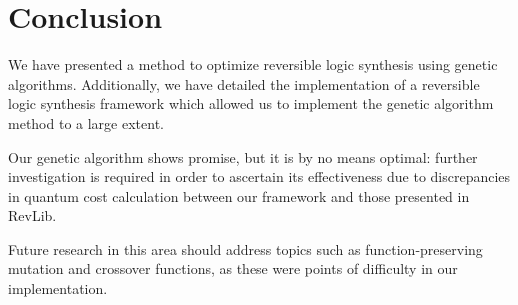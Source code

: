 \section{Conclusion}
We have presented a method to optimize reversible logic synthesis using genetic algorithms. Additionally, we have detailed the implementation of a reversible logic synthesis framework which allowed us to implement the genetic algorithm method to a large extent.

Our genetic algorithm shows promise, but it is by no means optimal: further investigation is required in order to ascertain its effectiveness due to discrepancies in quantum cost calculation between our framework and those presented in RevLib.

Future research in this area should address topics such as function-preserving mutation and crossover functions, as these were points of difficulty in our implementation.